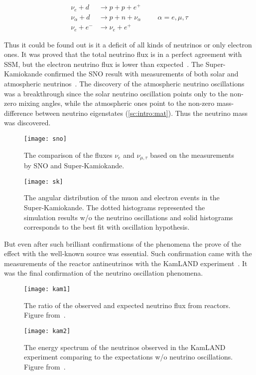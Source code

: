 \documentclass[../main.tex]{subfiles}
\begin{document}
\begin{align}
\nu_e+d&\to p+p+e^+ \\
\nu_\alpha+d&\to p+n+\nu_\alpha\hspace{1cm} \alpha =e,\mu,\tau \\
\nu_e+e^-&\to\nu_e+e^+
\end{align}

Thus it could be found out is it a deficit of all kinds of neutrinos or only electron ones. It was proved that the total neutrino flux is in a perfect agreement with SSM, but the electron neutrino flux is lower than expected~\cite{Ahmad2002}. The Super-Kamiokande confirmed the SNO result with measurements of both solar and atmospheric neutrinos~\cite{Fukuda1999}. The discovery of the atmospheric neutrino oscillations was a breakthrough since the solar neutrino oscillation points only to the non-zero mixing angles, while the atmospheric ones point to the non-zero mass-difference between neutrino eigenstates (\autoref{sc:intro:mat}). Thus the neutrino mass was discovered.

\begin{figure}
  \centering
  \begin{minipage}{0.49\linewidth}
  \centering
    \texttt{[image: sno]}
    \caption{The comparison of the fluxes $\nu_e$ and $\nu_{\mu,\tau}$ based on the measurements by SNO and Super-Kamiokande.}
    \label{fig:intro:sno}
  \end{minipage}
  \begin{minipage}{0.49\linewidth}
  \centering
    \texttt{[image: sk]}
    \caption{The angular distribution of the muon and electron events in the Super-Kamiokande. The dotted histograms represented the simulation results w/o the neutrino oscillations and solid histograms corresponds to the best fit with oscillation hypothesis.}
    \label{fig:intro:sk}
  \end{minipage}
\end{figure}

But even after such brilliant confirmations of the phenomena the prove of the effect with the well-known source was essential. Such confirmation came with the measurements of the reactor antineutrinos with the KamLAND experiment~\cite{Eguchi2003}. It was the final confirmation of the neutrino oscillation phenomena.

\begin{figure}
  \centering
  \begin{minipage}{0.45\linewidth}
  \centering
    \texttt{[image: kam1]}
    \caption{The ratio of the observed and expected neutrino flux from reactors. Figure from~\cite{Eguchi2003}.}
    \label{fig:intro:kam1}
  \end{minipage}
  \begin{minipage}{0.45\linewidth}
  \centering
    \texttt{[image: kam2]}
    \caption{The energy spectrum of the neutrinos observed in the KamLAND experiment comparing to the expectations w/o neutrino oscillations. Figure from~\cite{Eguchi2003}.}
    \label{fig:intro:kam2}
  \end{minipage}
\end{figure}
\end{document}
